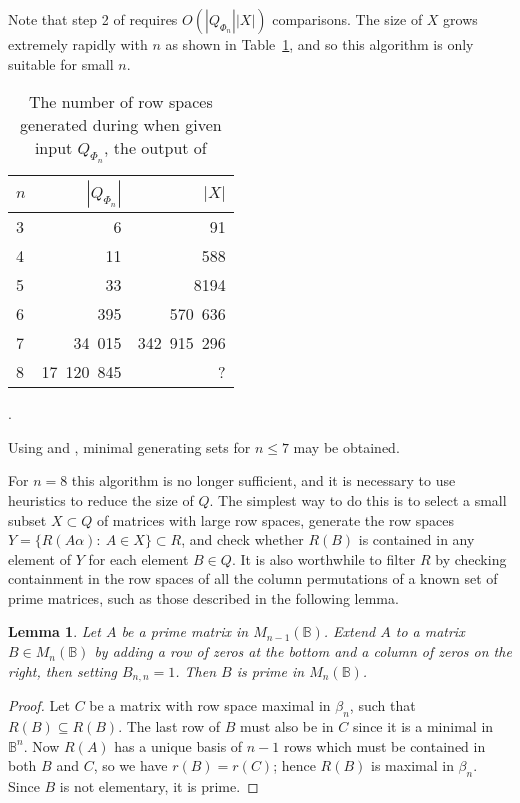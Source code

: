 \documentclass[11pt]{article}
\newtheorem{lemma}[thm]{Lemma}
\numberwithin{equation}{section}
\newcommand{\B}{\mathbb{B}}
\newcommand{\Bn}{M_n(\B)}
\begin{document}
Note that step 2 of  requires $O(|Q_{\Phi_n}||X|)$ comparisons.  The
size of $X$ grows extremely rapidly with $n$ as shown in
Table~\ref{tab:filter1numbers}, and so this algorithm is only suitable for small $n$.
\begin{table}
  \centering
  \begin{tabular}{l|r|r}
    $n$ & $|Q_{\Phi_n}|$ & $|X|$ \\
    \hline
    3 & 6 & 91 \\ 
    4 & 11 & 588 \\
    5 & 33 & 8194 \\
    6 & 395 & 570\ 636 \\ 
    7 & 34\ 015 & 342\ 915\ 296 \\
    8 & 17\ 120\ 845 & ? 
  \end{tabular}
\vspace{1cm}

\caption{The number of row spaces generated during  when
  given input $Q_{\Phi_n}$, the output of }. 
  \label{tab:filter1numbers}
\end{table}

Using  and , minimal
generating sets for $n \leq 7$ may be obtained.

For $n=8$ this algorithm is no longer sufficient, and it is necessary to use
heuristics to reduce the size of $Q$. The simplest way to do this is to select a
small subset $X \subset Q$ of matrices with large row spaces, generate the row
spaces $Y = \{R(A\alpha) :\: A \in X\} \subset R$, and check whether $R(B)$ is
contained in any element of $Y$ for each element $B \in Q$.  It is also
worthwhile to filter $R$ by checking containment in the row spaces of all the
column permutations of a known set of prime matrices, such as those described in
the following lemma.

\begin{lemma}
  Let $A$ be a prime matrix in $M_{n-1}(\B)$. Extend $A$ to a matrix $B \in \Bn$
  by adding a row of zeros at the bottom and a column of zeros on the right,
  then setting $B_{n,n} = 1$. Then $B$ is prime in $\Bn$.
\end{lemma}
\begin{proof}
  Let $C$ be a matrix with row space maximal in $\beta_n$, such that $R(B)
  \subseteq R(B)$.  The last row of $B$ must also be in $C$ since it is a
  minimal in $\B^{n}$. Now $R(A)$ has a unique basis of $n-1$ rows which must be
  contained in both $B$ and $C$, so we have $r(B) = r(C)$; hence $R(B)$ is
  maximal in $\beta_n$. Since $B$ is not elementary, it is prime.
\end{proof}
\end{document}

